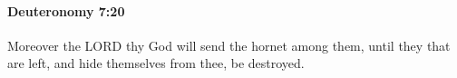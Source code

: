 
		\paragraph{Deuteronomy 7:20} %
			\label{DEUTERONOMY-7-20}

			Moreover the LORD thy God will send the hornet among them, until they that are left, and hide themselves from thee, be destroyed.


